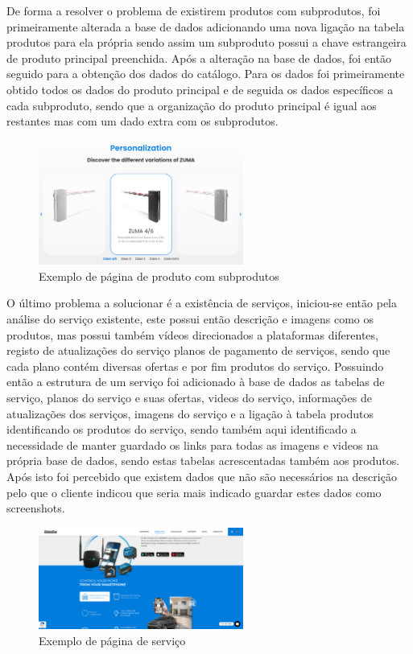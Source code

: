De forma a resolver o problema de existirem produtos com subprodutos, foi primeiramente alterada a base de dados adicionando uma nova ligação na tabela produtos para ela própria
sendo assim um subproduto possui a chave estrangeira de produto principal preenchida. Após a alteração na base de dados, foi então seguido para a obtenção dos dados do catálogo.
Para os dados foi primeiramente obtido todos os dados do produto principal e de seguida os dados específicos a cada subproduto, sendo que a organização do produto principal é igual
aos restantes mas com um dado extra com os subprodutos. 

\begin{figure}[htb]
    \centering
    \includegraphics[width=0.6\textwidth]{images/implementacao/scraper/zuma.png}
    \caption{Exemplo de página de produto com subprodutos}
    \label{fig:61}
\end{figure}

\newpage

O último problema a solucionar é a existência de serviços, iniciou-se então pela análise do serviço existente, este possui então 
descrição e imagens como os produtos, mas possui também vídeos direcionados a plataformas diferentes, registo de atualizações do serviço
planos de pagamento de serviços, sendo que cada plano contém diversas ofertas e por fim produtos do serviço. 
Possuindo então a estrutura de um serviço foi adicionado à base de dados as tabelas de serviço, planos do serviço e suas ofertas, videos do serviço, informações de atualizações dos serviços, imagens do serviço e a ligação à tabela produtos identificando os produtos do serviço, sendo também aqui identificado a necessidade de manter guardado os links para todas as imagens e videos na própria base de dados, sendo estas tabelas acrescentadas também aos produtos.
Após isto foi percebido que existem dados que não são necessários na descrição pelo que o cliente indicou que seria mais indicado guardar estes dados
como screenshots.
\begin{figure}[htb]
    \centering
    \includegraphics[width=0.6\textwidth]{images/implementacao/scraper/mconnect.png}
    \caption{Exemplo de página de serviço}
    \label{fig:62}
\end{figure}

